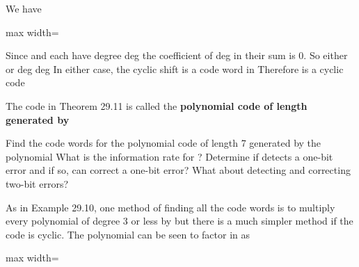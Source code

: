 \documentclass[11pt,oneside]{article}
\begin{document}
\begin{BookBody}
\noindent We have

\begin{center}\begin{adjustbox}{max width=\linewidth}\end{adjustbox}\end{center}

\end{BookBody}

\BookNarrativetrue

\begin{BookBody}

\noindent Since  and  each have degree  deg the coefficient of deg in their sum is 0. So either  or deg deg In either case, the cyclic shift  is a code word in  Therefore is a cyclic code\BookEnd{\blacklozenge}

 The code  in Theorem 29.11 is called the\textbf{ polynomial code of length}  \textbf{generated by} \BookEnd{\blacksquare}

 Find the code words for  the polynomial code of length 7 generated by the polynomial  What is the information rate for ? Determine if  detects a one-bit error and if so, can  correct a one-bit error? What about detecting and correcting two-bit errors?

 As in Example 29.10, one method of finding all the code words is to multiply every polynomial of degree 3 or less by  but there is a much simpler method if the code is cyclic. The polynomial  can be seen to factor in  as

\begin{center}\begin{adjustbox}{max width=\linewidth}\end{adjustbox}\end{center}


\end{BookBody}
\end{document}
